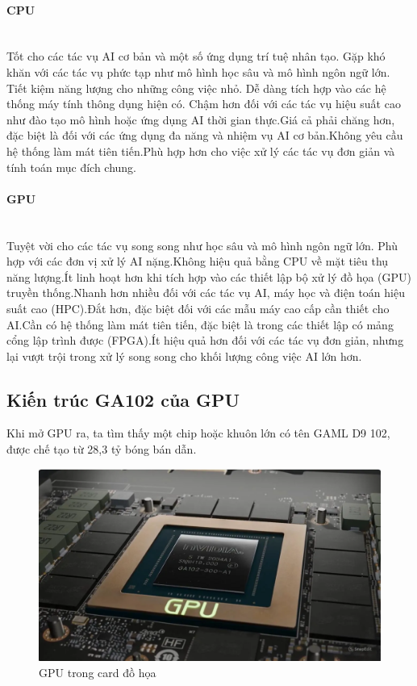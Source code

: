 \documentclass[a4paper]{article}
\begin{document}
\paragraph{CPU}\leavevmode\\

Tốt cho các tác vụ AI cơ bản và một số ứng dụng trí tuệ nhân tạo. Gặp khó khăn với các tác vụ phức tạp như mô hình học sâu và mô hình ngôn ngữ lớn.
Tiết kiệm năng lượng cho những công việc nhỏ.
Dễ dàng tích hợp vào các hệ thống máy tính thông dụng hiện có.
Chậm hơn đối với các tác vụ hiệu suất cao như đào tạo mô hình hoặc ứng dụng AI thời gian thực.Giá cả phải chăng hơn, đặc biệt là đối với các ứng dụng đa năng và nhiệm vụ AI cơ bản.Không yêu cầu hệ thống làm mát tiên tiến.Phù hợp hơn cho việc xử lý các tác vụ đơn giản và tính toán mục đích chung.

\paragraph{GPU}\leavevmode\\
Tuyệt vời cho các tác vụ song song như học sâu và mô hình ngôn ngữ lớn. Phù hợp với các đơn vị xử lý AI nặng.Không hiệu quả bằng CPU về mặt tiêu thụ năng lượng.Ít linh hoạt hơn khi tích hợp vào các thiết lập bộ xử lý đồ họa (GPU) truyền thống.Nhanh hơn nhiều đối với các tác vụ AI, máy học và điện toán hiệu suất cao (HPC).Đắt hơn, đặc biệt đối với các mẫu máy cao cấp cần thiết cho AI.Cần có hệ thống làm mát tiên tiến, đặc biệt là trong các thiết lập có mảng cổng lập trình được (FPGA).Ít hiệu quả hơn đối với các tác vụ đơn giản, nhưng lại vượt trội trong xử lý song song cho khối lượng công việc AI lớn hơn.
\subsection{Kiến trúc GA102 của GPU}
Khi mở GPU ra, ta tìm thấy một chip hoặc khuôn lớn có tên GAML D9 102, được chế tạo từ 28,3 tỷ bóng bán dẫn.
    
\begin{figure}[H]
    \centering
    \includegraphics[width=0.75\linewidth]{assets/gpu1.png}
    \caption{GPU trong card đồ họa}
    \label{fig:enter-label}
\end{figure}
    
\end{document}
